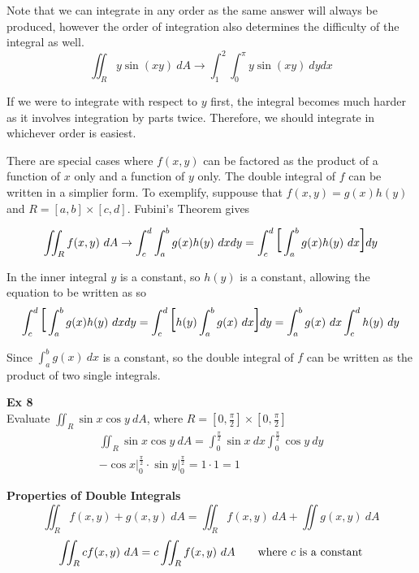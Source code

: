 \documentclass{article}
\begin{document}
 Note that we can integrate in any order as the same answer will always be produced, however the order of integration also determines the difficulty of the integral as well.
 \[
   \iint_R y\sin{(xy)}~dA \to \int^{2}_{1} \int^{\pi}_{0} y\sin{(xy)} ~dydx
 \]
 
 If we were to integrate with respect to $ y $ first, the integral becomes much harder as it involves integration by parts twice. Therefore, we should integrate in whichever order is easiest.

 There are special cases where $ f(x,y) $ can be factored as the product of a function of $ x $ only and a function of $ y $ only. The double integral of $ f $ can be written in a simplier form. To exemplify, suppouse that $ f(x,y) = g(x) h(y) $ and $ R = [a,b] \times [c,d] $. Fubini's Theorem gives 

 \[
   \begin{gathered}
   \iint_R f(x,y)~dA \to \int^{d}_{c} \int^{b}_{a} g(x)h(y)~dxdy = \int^{d}_{c} \text{\huge{[}} \int^{b}_{a} g(x)h(y) ~dx \text{\huge{]}} dy 
   \end{gathered}
 \]

 In the inner integral $ y $ is a constant, so $ h(y) $ is a constant, allowing the equation to be written as so
 \[
   \begin{gathered}
   \int^{d}_{c} \text{\huge{[}} \int^{b}_{a} g(x)h(y)~dxdy = \int^{d}_{c} \text{\huge{[}} h(y)\int^{b}_{a} g(x)~dx \text{\huge{]}} dy =  \int^{b}_{a} g(x)~dx \int^{d}_{c} h(y) ~ dy 
   \end{gathered}
 \]

 Since $ \int^{b}_{a} g(x)~dx $ is a constant, so the double integral of $ f $ can be written as the product of two single integrals. 

 \textbf{Ex 8}\\
  Evaluate $ \iint_R \sin{x}\cos{y}~dA $, where $ R= [0,\frac{\pi}{2}] \times [0,\frac{\pi}{2}] $
  \[
    \begin{gathered}
    \iint_R \sin{x}\cos{y}~dA = \int^{\frac{\pi}{2}}_{0} \sin{x}~dx \int^{\frac{\pi}{2}}_{0} \cos{y}~dy\\
    -\cos{x}\bigg|^{\frac{\pi}{2}}_0 \cdot \sin{y}\bigg|^{\frac{\pi}{2}}_0 = 1 \cdot 1 = \boxed{1}
    \end{gathered}
  \]

  \textbf{Properties of Double Integrals}
  \[
    \iint_R f(x,y) + g(x,y)~dA = \iint_R f(x,y)~dA + \iint g(x,y)~dA
  \]
  \[
    \iint_R c f(x,y)~dA = c\iint_R f(x,y)~dA \qquad \text{where $ c $ is a constant}
  \]
\end{document}
